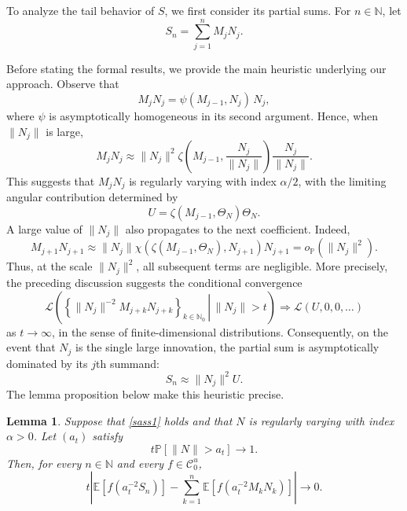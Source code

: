 \documentclass[preprint,12pt]{elsarticle}
\newtheorem{lem}[thm]{Lemma}
\theoremstyle{definition}
\theoremstyle{remark}
\newcommand{\Mbf}{{ M}}
\newcommand{\Ubf}{{ U}}
\newcommand{\Nbf}{{ N}}
\newcommand{\Sbf}{{ S}}
\newcommand{\1}{{\mathbf 1}}
\numberwithin{equation}{section}
\newcommand{\Ebb}{\mathbb{E}}  %
\newcommand{\Pbb}{\mathbb{P}}
\newcommand{\Ccal}{\mathcal{C}}
\begin{document}
  To analyze the tail behavior of $\Sbf$, we first consider its partial sums. 
  For $n \in \mathbb{N}$, let
  \begin{equation*}
    \Sbf_n = \sum_{j=1}^n \Mbf_j \Nbf_j.
  \end{equation*}

  Before stating the formal results, we provide the main heuristic underlying 
  our approach. Observe that
  \[
    \Mbf_j \Nbf_j = \psi(\Mbf_{j-1}, \Nbf_j)\, \Nbf_j,
  \]
  where $\psi$ is asymptotically homogeneous in its second argument. Hence, 
  when $\|\Nbf_j\|$ is large,
  \begin{equation*}
    \Mbf_j \Nbf_j
    \approx \|\Nbf_j\|^2
    \zeta\left(\Mbf_{j-1},\frac{\Nbf_j}{\|\Nbf_j\|}\right)
    \frac{\Nbf_j}{\|\Nbf_j\|}.
  \end{equation*}
  This suggests that $\Mbf_j\Nbf_j$ is regularly varying with index 
  $\alpha/2$, with the limiting angular contribution determined by
  \begin{equation*}
    \Ubf
    = \zeta(\Mbf_{j-1},\Theta_\Nbf)\Theta_\Nbf.
  \end{equation*}
  A large value of $\|\Nbf_j\|$ also propagates to the next coefficient. Indeed,
  \begin{equation*}
    \Mbf_{j+1}\Nbf_{j+1}
    \approx \|\Nbf_j\|
    \chi\left(\zeta(\Mbf_{j-1},\Theta_\Nbf),\Nbf_{j+1}\right)
    \Nbf_{j+1}
    = o_{\Pbb}\left(\|\Nbf_j\|^2\right).
  \end{equation*}
  Thus, at the scale $\|\Nbf_j\|^2$, all subsequent terms are negligible. More 
  precisely, the preceding discussion suggests the conditional convergence
  \begin{equation*}
    \mathcal{L}\left(
      \left.
      \left\{
        \|\Nbf_j\|^{-2}\Mbf_{j+k}\Nbf_{j+k}
      \right\}_{k\in\mathbb{N}_0}
      \,\right|\, \|\Nbf_j\|>t
    \right)
    \Longrightarrow
    \mathcal{L}\left(\Ubf,0,0,\ldots\right)
  \end{equation*}
  as $t\to\infty$, in the sense of finite-dimensional distributions.
  Consequently, on the event that $\Nbf_j$ is the single large innovation, 
  the partial sum is asymptotically dominated by its $j$th summand:
  \begin{equation*}
    \Sbf_n \approx \|\Nbf_j\|^2\Ubf.
  \end{equation*}
  The lemma proposition below make this heuristic precise.

  \begin{lem}\label{lem:one-large-innovation}
    Suppose that \eqref{sass1} holds and that $\Nbf$ is regularly varying 
    with index $\alpha>0$. Let $(a_t)$ satisfy
    \begin{equation*}
      t\Pbb[\|\Nbf\|>a_t]\longrightarrow 1.
    \end{equation*}
    Then, for every $n\in\mathbb{N}$ and every $f\in\Ccal_0^u$,
    \begin{equation}\label{eq:one-large-innovation}
      t\left|
        \Ebb\left[f\left(a_t^{-2}\Sbf_n\right)\right]
        -
        \sum_{k=1}^n
        \Ebb\left[
          f\left(a_t^{-2}\Mbf_k\Nbf_k\right)
        \right]
      \right|
      \longrightarrow 0.
    \end{equation}
  \end{lem}
\end{document}
